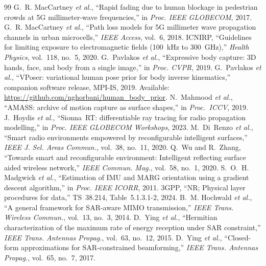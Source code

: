 \documentclass[journal,twocolumn,10pt]{IEEEtran}
\theoremstyle{plain}
\theoremstyle{definition}
\theoremstyle{remark}
\begin{document}
\begin{thebibliography}{99}
 G.~R. MacCartney \emph{et al.}, ``Rapid
fading due to human blockage in pedestrian crowds at 5G millimeter-wave
frequencies,'' in \emph{Proc. IEEE GLOBECOM}, 2017.
 G.~R. MacCartney \emph{et al.},
``Path loss models for 5G millimeter wave propagation channels in
urban microcells,'' \emph{IEEE Access}, vol.~6, 2018.
 ICNIRP, ``Guidelines for limiting exposure to
electromagnetic fields (100~kHz to 300~GHz),'' \emph{Health Physics},
vol.~118, no.~5, 2020.
 G.~Pavlakos \emph{et al.}, ``Expressive body
capture: 3D hands, face, and body from a single image,'' in \emph{Proc.
CVPR}, 2019.
 G.~Pavlakos \emph{et al.}, ``VPoser:
variational human pose prior for body inverse kinematics,''
companion software release, MPI-IS, 2019.
Available: \url{https://github.com/nghorbani/human_body_prior}.
 N.~Mahmood \emph{et al.}, ``AMASS: archive of
motion capture as surface shapes,'' in \emph{Proc.\ ICCV}, 2019.
 J.~Hoydis \emph{et al.}, ``Sionna~RT:
differentiable ray tracing for radio propagation modelling,'' in
\emph{Proc. IEEE GLOBECOM Workshops}, 2023.
 M.~Di~Renzo \emph{et al.}, ``Smart radio
environments empowered by reconfigurable intelligent surfaces,''
\emph{IEEE J. Sel. Areas Commun.}, vol.~38, no.~11, 2020.
 Q.~Wu and R.~Zhang, ``Towards smart and
reconfigurable environment: Intelligent reflecting surface aided
wireless network,'' \emph{IEEE Commun. Mag.}, vol.~58, no.~1, 2020.
 S.~O.~H. Madgwick \emph{et al.}, ``Estimation
of IMU and MARG orientation using a gradient descent algorithm,'' in
\emph{Proc. IEEE ICORR}, 2011.
 3GPP, ``NR; Physical layer procedures for data,''
TS~38.214, Table~5.1.3.1-2, 2024.
 B.~M. Hochwald \emph{et al.}, ``A general
framework for SAR-aware MIMO transmission,'' \emph{IEEE Trans.
Wireless Commun.}, vol.~13, no.~3, 2014.
 D.~Ying \emph{et al.}, ``Hermitian
characterization of the maximum rate of energy reception under SAR
constraint,'' \emph{IEEE Trans. Antennas Propag.}, vol.~63, no.~12,
2015.
 D.~Ying \emph{et al.}, ``Closed-form approximations
for SAR-constrained beamforming,'' \emph{IEEE Trans. Antennas
Propag.}, vol.~65, no.~7, 2017.

\end{thebibliography}
\end{document}

